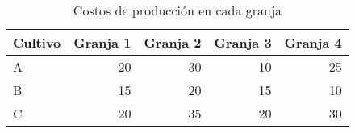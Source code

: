 \begin{table}[H]
\centering
\begin{tabular}{lrrrr}
\hline
Cultivo & Granja 1 & Granja 2 & Granja 3 & Granja 4 \\ \hline
A       & 20       & 30       & 10       & 25       \\
B       & 15       & 20       & 15       & 10       \\
C       & 20       & 35       & 20       & 30       \\ \hline
\end{tabular}
\caption{Costos de producción en cada granja}
\label{tabla:3}
\end{table}

